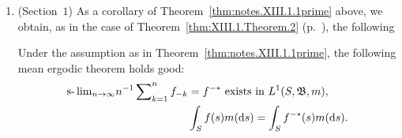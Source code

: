 \begin{enumerate}[1.]
\begin{remarku} Consider the deterministic case given by $P(t, x, E) = C_E(y_t(x))$, defined through a one-parameter family $\{y_t(x); -\infty < t < \infty\}$ of one-one transformation $x \to y_t(x)$ of $S$ onto $S$ such that $m(E) = m(y_t \cdot E)$. Then we see that the mapping $f \to f_t$ in Theorem~\ref{thm:XIII.1.Theorem.1} (p.~\pageref{thm:XIII.1.Theorem.1}) and the mapping $f \to f_{-t}$ in Theorem~\ref{thm:notes.XIII.1.1prime} are respectively given by $f_t(x) = f(y_t(x))$. 
and $f_{-t}(x) = f(y_{-t}(x))$. In this sense, a Markov process with an invariant measure $m$ is ``time reversible''.
\end{remarku}
\item (Section~\hyperref[sec:XIII.1]{$1$}) As a corollary of Theorem~\ref{thm:notes.XIII.1.1prime} above, we obtain, as in the case of Theorem~\ref{thm:XIII.1.Theorem.2} (p.~\pageref{thm:XIII.1.Theorem.2}), the following 

\begin{theoremn}\label{thm:notes.XIII.1.2prime} Under the assumption as in Theorem~\ref{thm:notes.XIII.1.1prime}, the following mean ergodic theorem holds good: 
\begin{align}
\underset {n \rightarrow \infty} {\slim} n ^{-1} \sum\limits_{k=1} ^{n} f _{-k}& = f ^{-*} \text{ exists in } L ^{1} (S, \mathfrak {B}, m), \label{eq:XIV.7.21a} \\
&\int_{S} f (s) m (\dd s) = \int_{S} f ^{-*} (s) m (\dd s). \label{eq:XIV.7.22b}
\end{align}
\end{theoremn}
\end{enumerate}

\label{notes:XIV}

